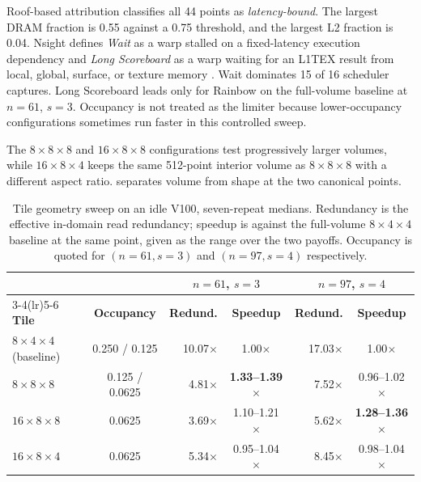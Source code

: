 Roof-based attribution classifies all 44 points as \emph{latency-bound}. The largest DRAM fraction is 0.55 against a 0.75 threshold, and the largest L2 fraction is 0.04. Nsight defines \emph{Wait} as a warp stalled on a fixed-latency execution dependency and \emph{Long Scoreboard} as a warp waiting for an L1TEX result from local, global, surface, or texture memory \cite{nvidia-nsight-compute}. Wait dominates 15 of 16 scheduler captures. Long Scoreboard leads only for Rainbow on the full-volume baseline at $n=61$, $s=3$. Occupancy is not treated as the limiter because lower-occupancy configurations sometimes run faster in this controlled sweep.

The $8\times8\times8$ and $16\times8\times8$ configurations test progressively larger volumes, while $16\times8\times4$ keeps the same 512-point interior volume as $8\times8\times8$ with a different aspect ratio.  separates volume from shape at the two canonical points.

\begin{table}[htbp!]
\centering
\caption{Tile geometry sweep on an idle V100, seven-repeat medians. Redundancy is the effective in-domain read redundancy; speedup is against the full-volume $8\times4\times4$ baseline at the same point, given as the range over the two payoffs. Occupancy is quoted for $(n{=}61, s{=}3)$ and $(n{=}97, s{=}4)$ respectively.}
\label{tab:ca-tiles}
\begin{tabular}{@{}lcrcrc@{}}
\toprule
& & \multicolumn{2}{c}{$n = 61$, $s = 3$} & \multicolumn{2}{c}{$n = 97$, $s = 4$} \\
\cmidrule(lr){3-4}\cmidrule(lr){5-6}
\textbf{Tile} & \textbf{Occupancy} & \textbf{Redund.} & \textbf{Speedup} & \textbf{Redund.} & \textbf{Speedup} \\
\midrule
$8\times4\times4$ (baseline) & 0.250 / 0.125 & 10.07$\times$ & 1.00$\times$ & 17.03$\times$ & 1.00$\times$ \\
$8\times8\times8$   & 0.125 / 0.0625 & 4.81$\times$ & \textbf{1.33--1.39$\times$} & 7.52$\times$ & 0.96--1.02$\times$ \\
$16\times8\times8$  & 0.0625 & 3.69$\times$ & 1.10--1.21$\times$ & 5.62$\times$ & \textbf{1.28--1.36$\times$} \\
$16\times8\times4$  & 0.0625 & 5.34$\times$ & 0.95--1.04$\times$ & 8.45$\times$ & 0.98--1.04$\times$ \\
\bottomrule
\end{tabular}
\end{table}

